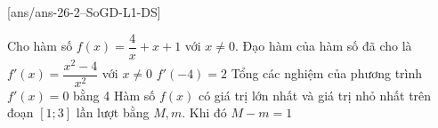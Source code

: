 

\cauds
{}[ans/ans-26-2--SoGD-L1-DS]
\begin{ex}%
	Cho hàm số $f(x)=\dfrac{4}{x}+x+1$ với $x \neq 0$. 
	\choiceTF
	{\True Đạo hàm của hàm số đã cho là $f'(x)=\dfrac{x^2-4}{x^2}$ với $x \neq 0$}
	{ $f'(-4)=2$}
	{Tổng các nghiệm của phương trình $f'(x)=0$ bằng 4}
	{\True Hàm số $f(x)$ có giá trị lớn nhất và giá trị nhỏ nhất trên đoạn $[1;3]$ lần lượt bằng $M,m$. Khi đó $M-m=1$}
\end{ex}

